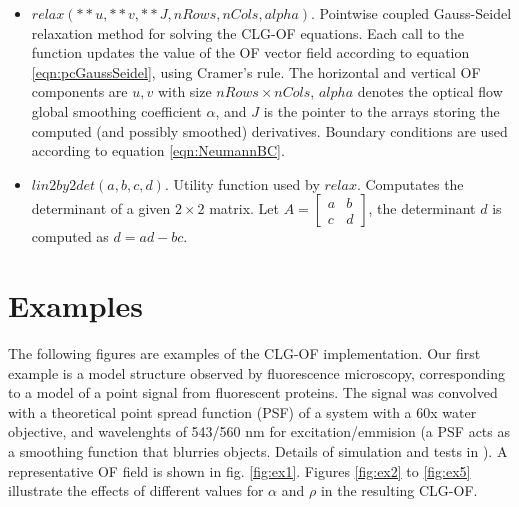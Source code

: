 \documentclass{article}
\begin{document}
\begin{itemize}
 \item $relax(**u, **v, **J, nRows, nCols, alpha)$. Pointwise coupled 
       Gauss-Seidel relaxation method for solving the CLG-OF equations. Each 
       call to the function updates the value of the OF vector field according 
       to equation \ref{eqn:pcGaussSeidel}, using Cramer's rule. The 
       horizontal and vertical OF components are $u,v$ with size 
       $nRows \times nCols$, $alpha$ denotes the optical flow global smoothing 
       coefficient $\alpha$, and $J$ is the pointer to the arrays storing the 
       computed (and possibly smoothed) derivatives. Boundary conditions are 
       used according to equation \ref{eqn:NeumannBC}.

 \item $lin2by2det(a, b, c, d)$.  Utility function used by $relax$. Computates 
       the determinant of a given $2 \times 2$ matrix. Let 
       $A = \left[ \begin{matrix} a & b \\ c & d \end{matrix} \right]$, the 
       determinant $d$ is computed as $d = ad - bc$.

\end{itemize}



\section{Examples}

The following figures are examples of the CLG-OF implementation. Our first 
example is a model structure observed by fluorescence microscopy, corresponding 
to a model of a point signal from fluorescent proteins. The signal was convolved 
with a theoretical point spread function (PSF) of a system with a 60x water 
objective, and wavelenghts of 543/560 nm for excitation/emmision (a PSF acts as 
a smoothing function that blurries objects. Details of simulation and tests in 
\cite{Delpiano11}). A representative OF field is shown in fig. \ref{fig:ex1}. 
Figures \ref{fig:ex2} to \ref{fig:ex5} illustrate the effects of different values 
for $\alpha$ and $\rho$ in the resulting CLG-OF.
\end{document}
